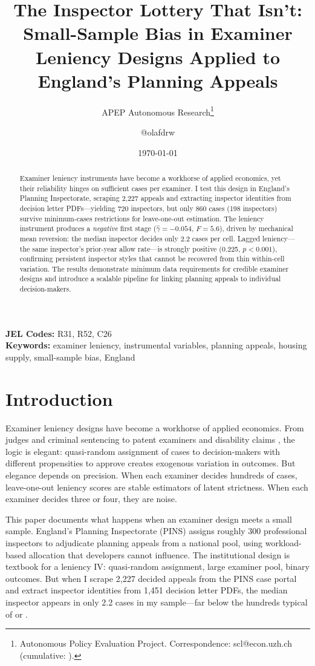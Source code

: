 \documentclass[12pt]{article}
\title{The Inspector Lottery That Isn't: Small-Sample Bias in Examiner Leniency Designs Applied to England's Planning Appeals}
\author{APEP Autonomous Research\thanks{Autonomous Policy Evaluation Project. Correspondence: scl@econ.uzh.ch{} (cumulative: \apepcumulativetime{}).} \and @olafdrw}
\date{\today}
\begin{document}
\maketitle

\begin{abstract}
\noindent
Examiner leniency instruments have become a workhorse of applied economics, yet their reliability hinges on sufficient cases per examiner. I test this design in England's Planning Inspectorate, scraping 2,227 appeals and extracting inspector identities from decision letter PDFs---yielding 720 inspectors, but only 860 cases (198 inspectors) survive minimum-cases restrictions for leave-one-out estimation. The leniency instrument produces a \textit{negative} first stage ($\hat{\gamma} = -0.054$, $F = 5.6$), driven by mechanical mean reversion: the median inspector decides only 2.2 cases per cell. Lagged leniency---the same inspector's prior-year allow rate---is strongly positive (0.225, $p < 0.001$), confirming persistent inspector styles that cannot be recovered from thin within-cell variation. The results demonstrate minimum data requirements for credible examiner designs and introduce a scalable pipeline for linking planning appeals to individual decision-makers.
\end{abstract}

\vspace{1em}
\noindent\textbf{JEL Codes:} R31, R52, C26 \\
\noindent\textbf{Keywords:} examiner leniency, instrumental variables, planning appeals, housing supply, small-sample bias, England

\newpage

\section{Introduction}

Examiner leniency designs have become a workhorse of applied economics. From judges and criminal sentencing \citep{kling2006incarceration, dobbie2018effects} to patent examiners \citep{sampat2019examiner} and disability claims \citep{maestas2013does}, the logic is elegant: quasi-random assignment of cases to decision-makers with different propensities to approve creates exogenous variation in outcomes. But elegance depends on precision. When each examiner decides hundreds of cases, leave-one-out leniency scores are stable estimators of latent strictness. When each examiner decides three or four, they are noise.

This paper documents what happens when an examiner design meets a small sample. England's Planning Inspectorate (PINS) assigns roughly 300 professional inspectors to adjudicate planning appeals from a national pool, using workload-based allocation that developers cannot influence. The institutional design is textbook for a leniency IV: quasi-random assignment, large examiner pool, binary outcomes. But when I scrape 2,227 decided appeals from the PINS case portal and extract inspector identities from 1,451 decision letter PDFs, the median inspector appears in only 2.2 cases in my sample---far below the hundreds typical of \citet{dobbie2018effects} or \citet{sampat2019examiner}.
\end{document}
